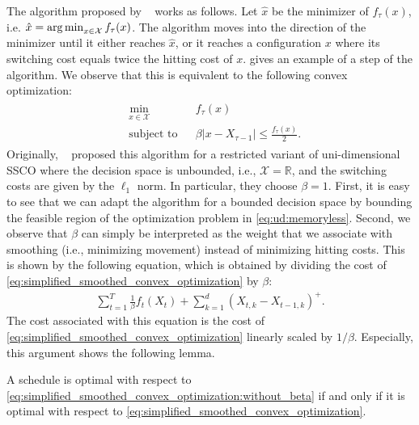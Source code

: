 The algorithm proposed by \citeauthor*{Bansal2015}~\cite{Bansal2015} works as follows. Let $\hat{x}$ be the minimizer of $f_{\tau}(x)$, i.e. $\hat{x} = \operatorname*{arg\,min}_{x \in \mathcal{X}} f_{\tau}(x)$. The algorithm moves into the direction of the minimizer until it either reaches $\hat{x}$, or it reaches a configuration $x$ where its switching cost equals twice the hitting cost of $x$.  gives an example of a step of the algorithm. We observe that this is equivalent to the following convex optimization: \begin{align}\label{eq:ud:memoryless}\begin{aligned}
    &\min_{x \in \mathcal{X}} &&f_{\tau}(x) \\
    &\text{subject to}        &&\beta |x - X_{\tau-1}| \leq \frac{f_{\tau}(x)}{2}.
\end{aligned}\end{align} Originally, \citeauthor*{Bansal2015}~\cite{Bansal2015} proposed this algorithm for a restricted variant of uni-dimensional SSCO where the decision space is unbounded, i.e., $\mathcal{X} = \mathbb{R}$, and the switching costs are given by the $\ell_1$ norm. In particular, they choose $\beta = 1$. First, it is easy to see that we can adapt the algorithm for a bounded decision space by bounding the feasible region of the optimization problem in \cref{eq:ud:memoryless}. Second, we observe that $\beta$ can simply be interpreted as the weight that we associate with smoothing (i.e., minimizing movement) instead of minimizing hitting costs. This is shown by the following equation, which is obtained by dividing the cost of \cref{eq:simplified_smoothed_convex_optimization} by $\beta$: \begin{align}\label{eq:simplified_smoothed_convex_optimization:without_beta}
    \sum_{t=1}^T \frac{1}{\beta} f_t(X_t) + \sum_{k=1}^d (X_{t,k} - X_{t-1,k})^+.
\end{align} The cost associated with this equation is the cost of \cref{eq:simplified_smoothed_convex_optimization} linearly scaled by $1 / \beta$. Especially, this argument shows the following lemma.

\begin{lemma}\label{lemma:switching_cost_absolute_vs_positive_movement}
A schedule is optimal with respect to \cref{eq:simplified_smoothed_convex_optimization:without_beta} if and only if it is optimal with respect to \cref{eq:simplified_smoothed_convex_optimization}.
\end{lemma}

